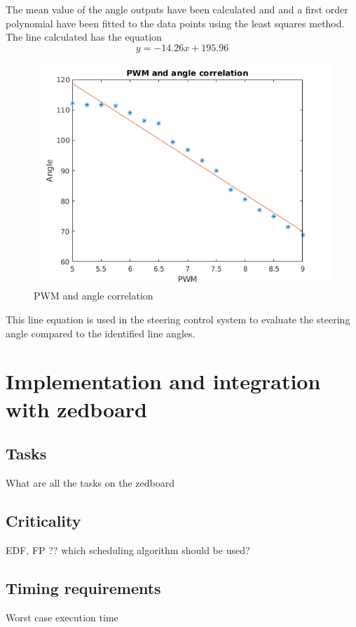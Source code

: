 The mean value of the angle outputs have been calculated and and a first order polynomial have been fitted to the data points using the least squares method. The line calculated has the equation $$ y=-14.26x + 195.96$$

\begin{figure}[H]
  \includegraphics[scale=0.9]{./img/PWMPLOT.png}
  \centering
  \caption{PWM and angle correlation}
  \label{fig:PWM and angle correlation}
\end{figure}

This line equation is used in the steering control system to evaluate the steering angle compared to the identified line angles.


\section{Implementation and integration with zedboard}
\subsection{Tasks}
What are all the tasks on the zedboard
\subsection{Criticality}
EDF, FP ?? which scheduling algorithm should be used?
\subsection{Timing requirements}
Worst case execution time